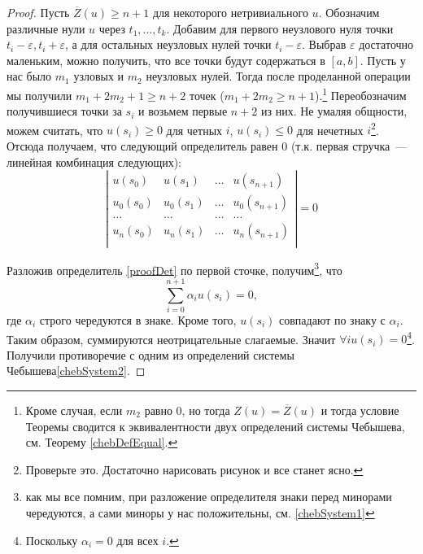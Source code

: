  \begin{proof}
Пусть $\overline{Z}(u) \geq n+1$ для некоторого нетривиального $u$. Обозначим различные нули $u$ через $t_1, …, t_k$. 
Добавим для первого неузлового нуля точки $t_i-\varepsilon, t_i+\varepsilon$, а для остальных неузловых нулей точки $t_i - \varepsilon$. Выбрав $\varepsilon$ достаточно маленьким, можно получить, что все точки будут содержаться в $[a,b]$. Пусть у нас было $m_1$ узловых и $m_2$ неузловых нулей. Тогда после проделанной операции мы получили $m_1 + 2m_2 + 1 \geq n+2$ точек ($m_1+2m_2 \geq n+1$).\footnote{Кроме случая, если $m_2$ равно $0$, но тогда
$Z(u) = \overline Z(u)$ и тогда условие Теоремы сводится к эквивалентности двух определений системы Чебышева, см. Теорему \ref{chebDefEqual}.}
Переобозначим получившиеся точки за $s_i$ и возьмем первые $n+2$ из них. Не умаляя общности, можем считать, что $u(s_{i}) \geq 0$ для четных $i$, $u(s_{i}) \leq 0$ для нечетных $i$\footnote{Проверьте это. Достаточно нарисовать рисунок и все станет ясно.}. Отсюда получаем, что следующий определитель равен 0 (т.к. первая стручка — линейная комбинация следующих):
\begin{equation}
\label{proofDet}
\left| \begin{array}{cccc}
u(s_0) & u(s_1) & … & u(s_{n+1}) \\
u_0(s_0) & u_0(s_1) & … & u_0(s_{n+1})\\
… & … & … & …\\
u_n(s_0) & u_n(s_1) & … & u_n(s_{n+1})\\ 
\end{array}
\right| = 0
\end{equation}

Разложив определитель \eqref{proofDet} по первой сточке, получим\footnote{как мы все помним, при разложение определителя знаки перед минорами чередуются, а сами миноры у нас положительны, см. \ref{chebSystem1}}, что 
$$\sum\limits_{i=0}^{n+1} \alpha_iu(s_i) = 0,$$
где $\alpha_i$ строго чередуются в знаке. Кроме того, $u(s_i)$ совпадают по знаку с $\alpha_i$. Таким образом, суммируются неотрицательные слагаемые. Значит $\forall i u(s_i) = 0$\footnote{Поскольку $\alpha_i = 0$ для всех $i$.}.
    Получили противоречие с одним из определений системы Чебышева\eqref{chebSystem2}.
 \end{proof}

